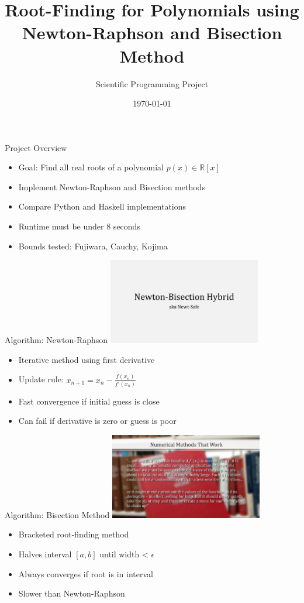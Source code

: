 \documentclass{beamer}
\title{Root-Finding for Polynomials using Newton-Raphson and Bisection Method}
\author{Scientific Programming Project}
\date{\today}
\begin{document}
\frame{\titlepage}

\begin{frame}{Project Overview}
\begin{itemize}
    \item Goal: Find all real roots of a polynomial \( p(x) \in \mathbb{R}[x] \)
    \item Implement Newton-Raphson and Bisection methods
    \item Compare Python and Haskell implementations
    \item Runtime must be under 8 seconds
    \item Bounds tested: Fujiwara, Cauchy, Kojima
\end{itemize}
\end{frame}

\begin{frame}{Algorithm: Newton-Raphson}
\includegraphics[width=0.5\textwidth]{context_frame_00.jpg}
\begin{itemize}
    \item Iterative method using first derivative
    \item Update rule: \( x_{n+1} = x_n - \frac{f(x_n)}{f'(x_n)} \)
    \item Fast convergence if initial guess is close
    \item Can fail if derivative is zero or guess is poor
\end{itemize}
\end{frame}

\begin{frame}{Algorithm: Bisection Method}
\includegraphics[width=0.5\textwidth]{context_frame_01.jpg}
\begin{itemize}
    \item Bracketed root-finding method
    \item Halves interval \([a, b]\) until width < \( \epsilon \)
    \item Always converges if root is in interval
    \item Slower than Newton-Raphson
\end{itemize}
\end{frame}
\end{document}
